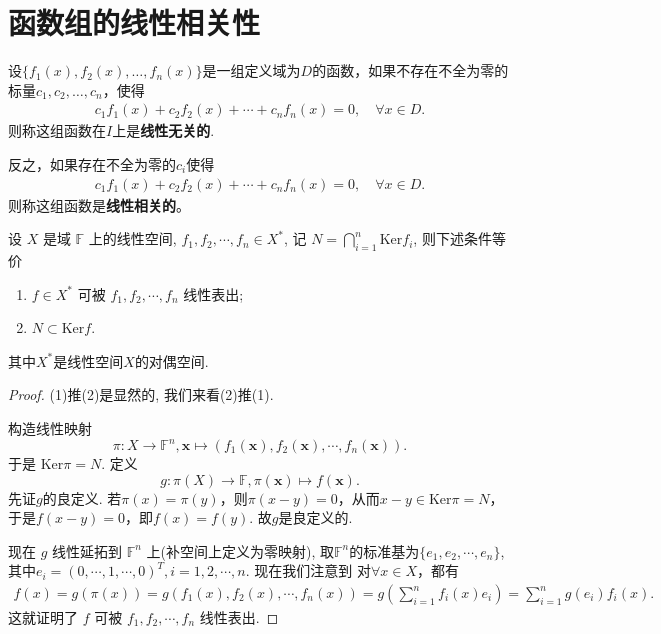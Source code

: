 \documentclass[../../main.tex]{subfiles}%
\begin{document}
\section{函数组的线性相关性}

\begin{definition}[函数组线性无关/相关]
设\(\{f_1(x), f_2(x), \ldots, f_n(x)\}\)是一组定义域为$D$的函数，如果不存在不全为零的标量\(c_1, c_2, \ldots, c_n\)，使得 
\begin{align*}
c_1 f_1(x) + c_2 f_2(x) + \cdots + c_n f_n(x) = 0,\quad \forall x\in D.
\end{align*}
则称这组函数在\(I\)上是\textbf{线性无关的}.

反之，如果存在不全为零的\(c_i\)使得
\begin{align*}
c_1 f_1(x) + c_2 f_2(x) + \cdots + c_n f_n(x) = 0,\quad \forall x\in D.
\end{align*}
则称这组函数是\textbf{线性相关的}。
\end{definition}

\begin{theorem}\label{theorem:高等代数的重要结论1}
设 \( X \) 是域 \( \mathbb{F} \) 上的线性空间, \( f_1, f_2, \cdots, f_n \in X^* \), 记 \( N = \bigcap_{i=1}^n \mathrm{Ker} f_i \), 则下述条件等价
\begin{enumerate}[(1)]
\item \( f \in X^* \) 可被 \( f_1, f_2, \cdots, f_n \) 线性表出;

\item \( N \subset \mathrm{Ker} f \).
\end{enumerate}
其中$X^*$是线性空间$X$的对偶空间.
\end{theorem}
\begin{proof}
(1)推(2)是显然的, 我们来看(2)推(1).

构造线性映射
\[
\pi: X \to \mathbb{F}^n, \mathbf{x} \mapsto (f_1(\mathbf{x}), f_2(\mathbf{x}), \cdots, f_n(\mathbf{x})).
\]
于是 \( \mathrm{Ker} \pi = N \). 定义
\[
g: \pi(X) \to \mathbb{F}, \pi(\mathbf{x}) \mapsto f(\mathbf{x}).
\]
先证$g$的良定义. 若$\pi(x) = \pi(y)$，则$\pi(x - y) = 0$，从而$x - y \in \mathrm{Ker} \pi = N$，于是$f(x - y) = 0$，即$f(x) = f(y)$. 故$g$是良定义的.

现在 \( g \) 线性延拓到 \( \mathbb{F}^n \) 上(补空间上定义为零映射), 取$\mathbb{F}^n$的标准基为$\{e_1,e_2,\cdots,e_n\}$,其中$e_i=(0,\cdots,1,\cdots,0)^T,i=1,2,\cdots,n$.
现在我们注意到
对$\forall x \in X$，都有
\begin{align*}
f(x) = g(\pi(x)) = g(f_1(x), f_2(x), \cdots, f_n(x)) = g\left( \sum_{i=1}^n f_i(x) e_i \right) = \sum_{i=1}^n g(e_i) f_i(x).
\end{align*}
这就证明了 \( f \) 可被 \( f_1, f_2, \cdots, f_n \) 线性表出.
\end{proof}
\end{document}
